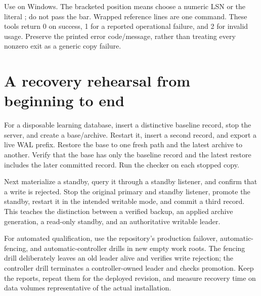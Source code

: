 Use  on Windows. The bracketed  position means
choose a numeric LSN or the literal ; do not pass the bar.
Wrapped reference lines are one command. These tools return 0 on success,
1 for a reported operational failure, and 2 for invalid usage. Preserve the
printed error code/message, rather than treating every nonzero exit as a
generic copy failure.


\section{A recovery rehearsal from beginning to end}

For a disposable learning database, insert a distinctive baseline record,
stop the server, and create a base/archive. Restart it, insert a second record,
and export a live WAL prefix. Restore the base to one fresh path and the
latest archive to another. Verify that the base has only the baseline record
and the latest restore includes the later committed record. Run the checker
on each stopped copy.

Next materialize a standby, query it through a standby listener, and confirm
that a write is rejected. Stop the original primary and standby listener,
promote the standby, restart it in the intended writable mode, and commit a
third record. This teaches the distinction between a verified backup, an
applied archive generation, a read-only standby, and an authoritative writable
leader.

For automated qualification, use the repository's production failover,
automatic-fencing, and automatic-controller drills in new empty work roots.
The fencing drill deliberately leaves an old leader alive and verifies write
rejection; the controller drill terminates a controller-owned leader and
checks promotion. Keep the reports, repeat them for the deployed revision,
and measure recovery time on data volumes representative of the actual
installation.

